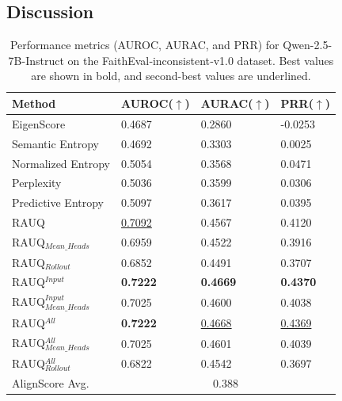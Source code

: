 \documentclass[letterpaper]{article} %
\begin{document}
\subsection{Discussion}
\begin{table}[t!]
\setlength{\tabcolsep}{1mm}
\begin{tabular}{llll}
\toprule
Method                     & AUROC($\uparrow$)           & AURAC($\uparrow$)           & PRR($\uparrow$)            \\ \midrule
EigenScore            & 0.4687          & 0.2860           & -0.0253        \\
Semantic Entropy      & 0.4692          & 0.3303          & 0.0025         \\
Normalized Entropy    & 0.5054          & 0.3568          & 0.0471         \\
Perplexity            & 0.5036          & 0.3599          & 0.0306         \\
Predictive Entropy    & 0.5097          & 0.3617          & 0.0395         \\
RAUQ                  & \underline{0.7092}          & 0.4567          & 0.4120          \\ \midrule
RAUQ$_{Mean\_Heads}$       & 0.6959          & 0.4522          & 0.3916         \\
RAUQ$_{Rollout}$         & 0.6852          & 0.4491          & 0.3707         \\
RAUQ$^{Input}$            & \textbf{0.7222} & \textbf{0.4669} & \textbf{0.4370} \\
RAUQ$_{Mean\_Heads}^{Input}$ & 0.7025          & 0.4600            & 0.4038         \\
RAUQ$^{All}$              & \textbf{0.7222} & \underline{0.4668}          & \underline{0.4369}         \\
RAUQ$_{Mean\_Heads}^{All}$   & 0.7025          & 0.4601          & 0.4039         \\
RAUQ$_{Rollout}^{All}$      & 0.6822          & 0.4542          & 0.3697         \\ \midrule \midrule
AlignScore Avg.    & \multicolumn{3}{c}{0.388}   \\ \bottomrule
\end{tabular}
\caption{Performance metrics (AUROC, AURAC, and PRR) for Qwen-2.5-7B-Instruct on the FaithEval‑inconsistent‑v1.0 dataset. Best values are shown in bold, and second-best values are underlined.}
\label{tab:qwen}
\end{table}
\end{document}
